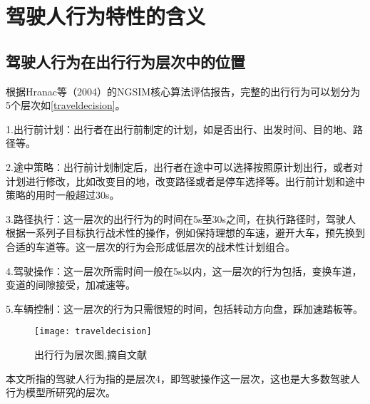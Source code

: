 \chapter{驾驶人行为特性的含义}
\section{驾驶人行为在出行行为层次中的位置}
根据Hranac等（2004）的NGSIM核心算法评估报告\cite{Hranac2004}，完整的出行行为可以划分为5个层次如\autoref{traveldecision}。

1.出行前计划：出行者在出行前制定的计划，如是否出行、出发时间、目的地、路径等。

2.途中策略：出行前计划制定后，出行者在途中可以选择按照原计划出行，或者对计划进行修改，比如改变目的地，改变路径或者是停车选择等。出行前计划和途中策略的用时一般超过30s。

3.路径执行：这一层次的出行行为的时间在5s至30s之间，在执行路径时，驾驶人根据一系列子目标执行战术性的操作，例如保持理想的车速，避开大车，预先换到合适的车道等。这一层次的行为会形成低层次的战术性计划组合。

4.驾驶操作：这一层次所需时间一般在5s以内，这一层次的行为包括，变换车道，变道的间隙接受，加减速等。

5.车辆控制：这一层次的行为只需很短的时间，包括转动方向盘，踩加速踏板等。

\begin{figure}[htpb]
	\centering
	\texttt{[image: traveldecision]}
	\caption{出行行为层次图,摘自文献\citet{Hranac2004}}
	\label{traveldecision}
\end{figure}

本文所指的驾驶人行为指的是层次4，即驾驶操作这一层次，这也是大多数驾驶人行为模型所研究的层次。

